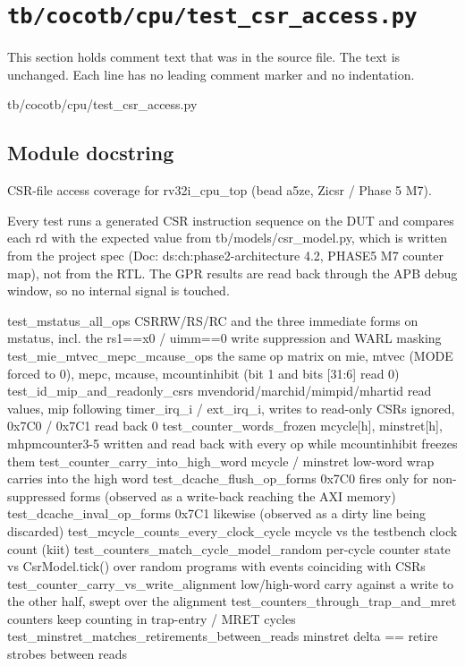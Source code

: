 \section{\texttt{tb/cocotb/cpu/test\_csr\_access.py}}\label{tm:suite:cpu-test-csr-access}

This section holds comment text that was in the source file. The text is unchanged. Each line has no leading comment marker and no indentation.

\begin{relocated}{tb/cocotb/cpu/test_csr_access.py}

\subsection*{Module docstring}

\begin{textblock}
CSR-file access coverage for rv32i_cpu_top (bead a5ze, Zicsr / Phase 5 M7).

Every test runs a generated CSR instruction sequence on the DUT and compares each rd with the
expected value from tb/models/csr_model.py, which is written from the project spec
(Doc: ds:ch:phase2-architecture 4.2, PHASE5 M7 counter map), not from the RTL.  The
GPR results are read back through the APB debug window, so no internal signal is touched.

test_mstatus_all_ops              CSRRW/RS/RC and the three immediate forms on mstatus, incl.
the rs1==x0 / uimm==0 write suppression and WARL masking
test_mie_mtvec_mepc_mcause_ops    the same op matrix on mie, mtvec (MODE forced to 0), mepc,
mcause, mcountinhibit (bit 1 and bits [31:6] read 0)
test_id_mip_and_readonly_csrs     mvendorid/marchid/mimpid/mhartid read values, mip following
timer_irq_i / ext_irq_i, writes to read-only CSRs ignored,
0x7C0 / 0x7C1 read back 0
test_counter_words_frozen         mcycle[h], minstret[h], mhpmcounter3-5 written and read back
with every op while mcountinhibit freezes them
test_counter_carry_into_high_word mcycle / minstret low-word wrap carries into the high word
test_dcache_flush_op_forms        0x7C0 fires only for non-suppressed forms (observed as a
write-back reaching the AXI memory)
test_dcache_inval_op_forms        0x7C1 likewise (observed as a dirty line being discarded)
test_mcycle_counts_every_clock_cycle           mcycle vs the testbench clock count (kiit)
test_counters_match_cycle_model_random         per-cycle counter state vs CsrModel.tick() over
random programs with events coinciding with CSRs
test_counter_carry_vs_write_alignment          low/high-word carry against a write to the other
half, swept over the alignment
test_counters_through_trap_and_mret            counters keep counting in trap-entry / MRET cycles
test_minstret_matches_retirements_between_reads  minstret delta == retire strobes between reads
\end{textblock}


\end{relocated}
